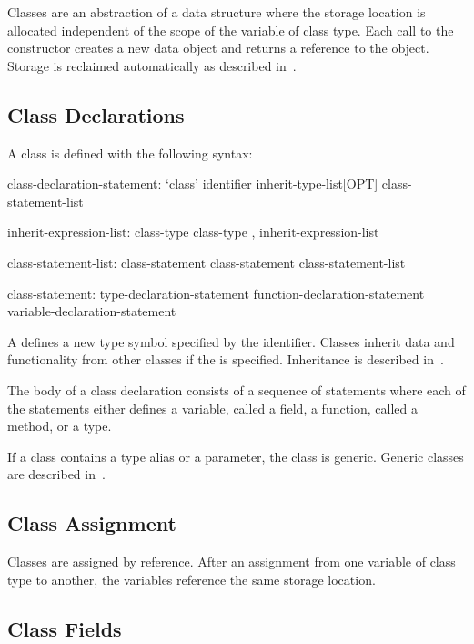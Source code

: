 \label{Classes}

Classes are an abstraction of a data structure where the storage
location is allocated independent of the scope of the variable of
class type.  Each call to the constructor creates a new data object
and returns a reference to the object.  Storage is reclaimed
automatically as described in~.

\subsection{Class Declarations}
\label{Class_Declarations}

A class is defined with the following syntax:
\begin{syntax}
class-declaration-statement:
  `class' identifier inherit-type-list[OPT] {
    class-statement-list }

inherit-expression-list:
  class-type
  class-type , inherit-expression-list

class-statement-list:
  class-statement
  class-statement class-statement-list

class-statement:
  type-declaration-statement
  function-declaration-statement
  variable-declaration-statement
\end{syntax}
A  defines a new type symbol
specified by the identifier.  Classes inherit data and functionality
from other classes if the  is specified.
Inheritance is described in~.

The body of a class declaration consists of a sequence of statements
where each of the statements either defines a variable, called a
field, a function, called a method, or a type.

If a class contains a type alias or a parameter, the class is generic.
Generic classes are described in~.

\subsection{Class Assignment}
\label{Class_Assignment}

Classes are assigned by reference.  After an assignment from one
variable of class type to another, the variables reference the same
storage location.

\subsection{Class Fields}
\label{Class_Fields}

